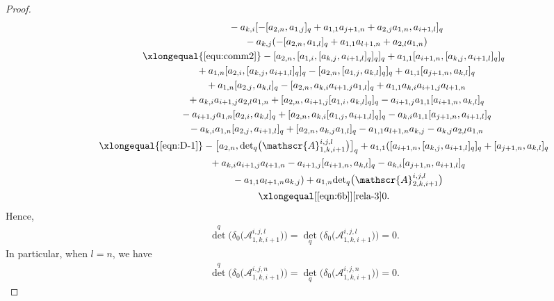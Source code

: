 \documentclass[pdftex]{sigma}
\numberwithin{equation}{section}
\def\d{\delta}
\def\A{\mathscr{A}}
\begin{document}
\begin{proof}
\begin{gather*}
 \phantom{\qquad\qquad\qquad\ \, }{} -a_{k,i} [- [a_{2,n},a_{1,j} ]_q+a_{1,1}a_{j+1,n}+a_{2,j}a_{1,n}, a_{i+1,l} ]_q\\
 \phantom{\qquad\qquad\qquad\ \, }{} -a_{k,j} (- [a_{2,n},a_{1,l} ]_q+a_{1,1}a_{l+1,n}+a_{2,l}a_{1,n} ) \\
\qquad\qquad \xlongequal{\eqref{equ:comm2}} - [a_{2,n}, [a_{1,i}, [a_{k,j}, a_{i+1,l} ]_q ]_q ]_q +a_{1,1} [a_{i+1,n}, [a_{k,j}, a_{i+1,l} ]_q ]_q \\
 \phantom{\qquad\qquad\qquad\ \,}{} +a_{1,n} [a_{2,i}, [a_{k,j}, a_{i+1,l} ]_q ]_q - [a_{2,n}, [a_{1,j}, a_{k,l} ]_q ]_q +a_{1,1} [a_{j+1,n},a_{k,l} ]_q\\
 \phantom{\qquad\qquad\qquad\ \,}{} +a_{1,n} [a_{2,j}, a_{k,l} ]_q - [a_{2,n},a_{k,i}a_{i+1,j}a_{1,l} ]_q +a_{1,1}a_{k,i}a_{i+1,j}a_{l+1,n} \\
 \phantom{\qquad\qquad\qquad\ \,}{} +a_{k,i}a_{i+1,j}a_{2,l}a_{1,n} + [a_{2,n},a_{i+1,j} [a_{1,i}, a_{k,l} ]_q ]_q -a_{i+1,j}a_{1,1} [a_{i+1,n}, a_{k,l} ]_q\\
 \phantom{\qquad\qquad\qquad\ \,}{} -a_{i+1,j}a_{1,n} [a_{2,i}, a_{k,l} ]_q + [a_{2,n},a_{k,i} [a_{1,j}, a_{i+1,l} ]_q ]_q-a_{k,i}a_{1,1} [a_{j+1,n}, a_{i+1,l} ]_q \\
 \phantom{\qquad\qquad\qquad\ \,}{} -a_{k,i}a_{1,n} [a_{2,j}, a_{i+1,l} ]_q + [a_{2,n},a_{k,j}a_{1,l} ]_q-a_{1,1}a_{l+1,n}a_{k,j}-a_{k,j}a_{2,l}a_{1,n}\\
\qquad\qquad \xlongequal{\eqref{eqn:D-1}} - \bigl[a_{2,n},{\det}_q \bigl(\A_{1,k,i+1}^{i,j,l} \bigr) \bigr]_q +a_{1,1} ( [a_{i+1,n}, [a_{k,j}, a_{i+1,l} ]_q ]_q + [a_{j+1,n},a_{k,l} ]_q \\
 \phantom{\qquad\qquad\qquad\ \, \ }{} +a_{k,i}a_{i+1,j}a_{l+1,n} -a_{i+1,j} [a_{i+1,n}, a_{k,l} ]_q-a_{k,i} [a_{j+1,n}, a_{i+1,l} ]_q\\
 \phantom{\qquad\qquad\qquad\ \,\ }{} -a_{1,1}a_{l+1,n}a_{k,j} ) +a_{1,n}{\det}_q \bigl(\A_{2,k,i+1}^{i,j,l} \bigr)\\
\qquad\qquad \xlongequal[\eqref{eqn:6b}]{\eqref{rela-3}}0.
\end{gather*}
Hence,
\begin{gather*}
{\det}^q \bigl(\d_0 \bigl(\A_{1,k,i+1}^{i,j,l}\bigr) \bigr) ={\det}_q \bigl(\d_0 \bigl(\A_{1,k,i+1}^{i,j,l}\bigr) \bigr)=0.
\end{gather*}
In particular, when $l=n$, we have
\begin{gather*}
{\det}^q \bigl(\d_0 \bigl(\A_{1,k,i+1}^{i,j,n} \bigr) \bigr) ={\det}_q \bigl(\d_0 \bigl(\A_{1,k,i+1}^{i,j,n} \bigr) \bigr)=0.

\end{gather*}
\end{proof}
\end{document}
